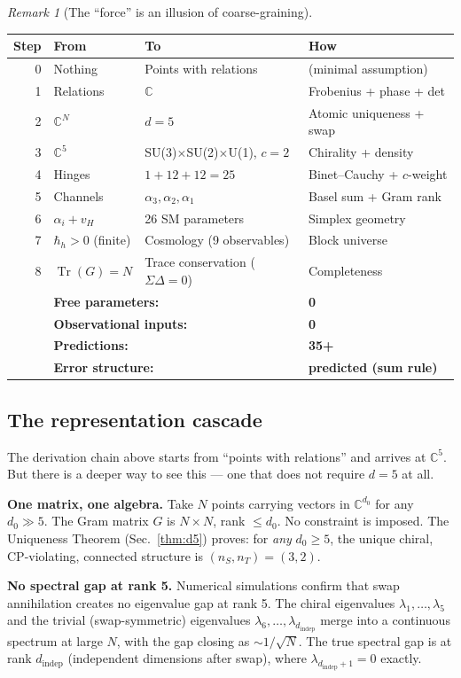 \documentclass[12pt]{article}
\theoremstyle{remark}
\newtheorem{remark}[theorem]{Remark}
\theoremstyle{definition}
\newcommand{\CC}{\mathbb{C}}
\newcommand{\tr}{\operatorname{Tr}}
\begin{document}
\begin{remark}[The ``force'' is an illusion of coarse-graining]
\begin{center}
\begin{tabular}{rlll}
\hline
Step & From & To & How \\
\hline
0 & Nothing & Points with relations & (minimal assumption) \\
1 & Relations & $\CC$ & Frobenius + phase + det \\
2 & $\CC^N$ & $d = 5$ & Atomic uniqueness + swap \\
3 & $\CC^5$ & SU(3)$\times$SU(2)$\times$U(1), $c\!=\!2$ & Chirality + density \\
4 & Hinges & $1 + 12 + 12 = 25$ & Binet--Cauchy + $c$-weight \\
5 & Channels & $\alpha_3, \alpha_2, \alpha_1$ & Basel sum + Gram rank \\
6 & $\alpha_i + v_H$ & 26 SM parameters & Simplex geometry \\
7 & $\hbar_h > 0$ (finite) & Cosmology (9 observables) & Block universe \\
8 & $\tr(G) = N$ & Trace conservation ($\Sigma\Delta = 0$) & Completeness \\
\hline
& \multicolumn{2}{l}{\textbf{Free parameters:}} & \textbf{0} \\
& \multicolumn{2}{l}{\textbf{Observational inputs:}} & \textbf{0} \\
& \multicolumn{2}{l}{\textbf{Predictions:}} & \textbf{35+} \\
& \multicolumn{2}{l}{\textbf{Error structure:}} & \textbf{predicted (sum rule)} \\
\hline
\end{tabular}
\end{center}

\subsection{The representation cascade}

The derivation chain above starts from ``points with relations'' and arrives at $\CC^5$. But there is a deeper way to see this --- one that does not require $d = 5$ at all.

\textbf{One matrix, one algebra.} Take $N$ points carrying vectors in $\CC^{d_0}$ for any $d_0 \gg 5$. The Gram matrix $G$ is $N \times N$, rank $\leq d_0$. No constraint is imposed. The Uniqueness Theorem (Sec.~\ref{thm:d5}) proves: for \emph{any} $d_0 \geq 5$, the unique chiral, CP-violating, connected structure is $(n_S, n_T) = (3, 2)$.

\textbf{No spectral gap at rank 5.} Numerical simulations confirm that swap annihilation creates no eigenvalue gap at rank 5. The chiral eigenvalues $\lambda_1, \ldots, \lambda_5$ and the trivial (swap-symmetric) eigenvalues $\lambda_6, \ldots, \lambda_{d_\text{indep}}$ merge into a continuous spectrum at large $N$, with the gap closing as $\sim 1/\sqrt{N}$. The true spectral gap is at rank $d_\text{indep}$ (independent dimensions after swap), where $\lambda_{d_\text{indep}+1} = 0$ exactly.


\end{remark}
\end{document}

